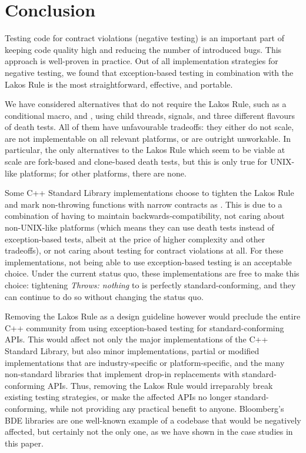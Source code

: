 \section{Conclusion}

Testing code for contract violations (negative testing) is an important part of keeping code quality high and reducing the number of introduced bugs. This approach is well-proven in practice. Out of all implementation strategies for negative testing, we found that exception-based testing in combination with the Lakos Rule is the most straightforward, effective, and portable.

We have considered alternatives that do not require the Lakos Rule, such as a conditional  macro,  and , using child threads, signals, and three different flavours of death tests. All of them have unfavourable tradeoffs: they either do not scale, are not implementable on all relevant platforms, or are outright unworkable. In particular, the only alternatives to the Lakos Rule which seem to be viable at scale are fork-based and clone-based death tests, but this is only true for UNIX-like platforms; for other platforms, there are none.

Some C++ Standard Library implementations choose to tighten the Lakos Rule and mark non-throwing functions with narrow contracts as . This is due to a combination of having to maintain backwards-compatibility, not caring about non-UNIX-like platforms (which means they can use death tests instead of exception-based tests, albeit at the price of higher complexity and other tradeoffs), or not caring about testing for contract violations at all. For these implementations, not being able to use exception-based testing is an acceptable choice. Under the current status quo, these implementations are free to make this choice: tightening \emph{Throws: nothing} to  is perfectly standard-conforming, and they can continue to do so without changing the status quo.

Removing the Lakos Rule as a design guideline however would preclude the entire C++ community from using exception-based testing for standard-conforming APIs. This would affect not only the major implementations of the C++ Standard Library, but also minor implementations, partial or modified implementations that are industry-specific or platform-specific, and the many non-standard libraries that implement drop-in replacements with standard-conforming APIs. Thus, removing the Lakos Rule would irreparably break existing testing strategies, or make the affected APIs no longer standard-conforming, while not providing any practical benefit to anyone. Bloomberg's BDE libraries are one well-known example of a codebase that would be negatively affected, but certainly not the only one, as we have shown in the case studies in this paper. 

